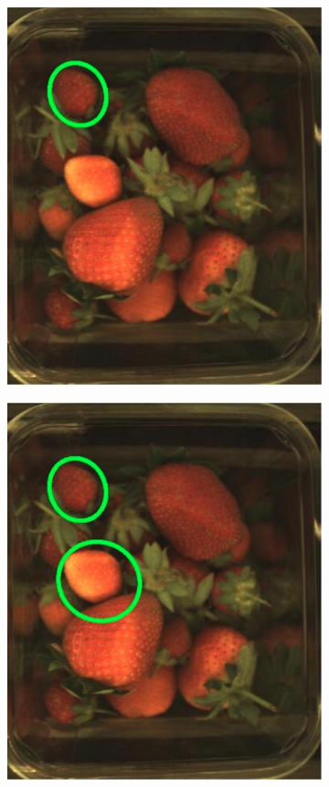 \documentclass[fleqn,twoside,12pt]{report}
\begin{document}
\begin{figure}[h]
	\centering
	\begin{subfigure}{.33\textwidth}
		\centering
		\includegraphics[width=.9\linewidth]{small_a_4.jpg}
		\caption{}
		\label{fig:small_a_4}
	\end{subfigure}%
	\begin{subfigure}{.33\textwidth}
		\centering
		\includegraphics[width=.9\linewidth]{small_b_4.jpg}
		\caption{}
		\label{fig:small_b_4}
	\end{subfigure}%
	

\end{figure}
\end{document}
